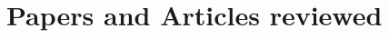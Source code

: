 \documentclass[a4paper]{article}
\title{\docTitle}
\author{\docAuthor}
\date{}
\begin{document}
    \maketitle
    \flushbottom
    \tableofcontents
    \clearpage

    

    \chapter{Papers and Articles reviewed}\label{ch:papers-reviewed}
    
    
    
    
    

    \clearpage
    \appendix
    
\end{document}
